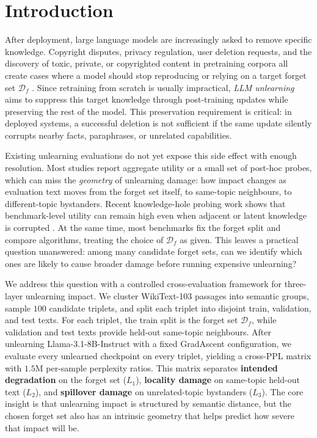 \documentclass[11pt,a4paper]{article}
\newcommand{\Df}{\mathcal{D}_f}
\newcommand{\Lone}{L_1}
\newcommand{\Ltwo}{L_2}
\newcommand{\Lthree}{L_3}
\begin{document}
\section{Introduction}
\label{sec:intro}

After deployment, large language models are increasingly asked to remove
specific knowledge. Copyright disputes, privacy regulation, user deletion
requests, and the discovery of toxic, private, or copyrighted content in
pretraining corpora all create cases where a model should stop reproducing or
relying on a target forget set $\Df$
\citep{maini2024tofu, shi2024muse, dorna2025openunlearning}. Since retraining
from scratch is usually impractical, \emph{LLM unlearning} aims to suppress
this target knowledge through post-training updates while preserving the rest
of the model. This preservation requirement is critical: in deployed systems, a
successful deletion is not sufficient if the same update silently corrupts
nearby facts, paraphrases, or unrelated capabilities.

Existing unlearning evaluations do not yet expose this side effect with enough
resolution. Most studies report aggregate utility or a small set of post-hoc
probes, which can miss the \emph{geometry} of unlearning damage: how impact
changes as evaluation text moves from the forget set itself, to same-topic
neighbours, to different-topic bystanders. Recent knowledge-hole probing work
shows that benchmark-level utility can remain high even when adjacent or latent
knowledge is corrupted \citep{ko2025probing}. At the same time, most benchmarks
fix the forget split and compare algorithms, treating the choice of $\Df$ as
given. This leaves a practical question unanswered: among many candidate forget
sets, can we identify which ones are likely to cause broader damage before
running expensive unlearning?

We address this question with a controlled cross-evaluation framework for
three-layer unlearning impact. We cluster WikiText-103 passages into semantic
groups, sample $100$ candidate triplets, and split each triplet into disjoint
train, validation, and test texts. For each triplet, the train split is the
forget set $\Df$, while validation and test texts provide held-out same-topic
neighbours. After unlearning Llama-3.1-8B-Instruct with a fixed GradAscent
configuration, we evaluate every unlearned checkpoint on every triplet,
yielding a cross-PPL matrix with $1.5$M per-sample perplexity ratios. This
matrix separates \textbf{intended degradation} on the forget set ($\Lone$),
\textbf{locality damage} on same-topic held-out text ($\Ltwo$), and
\textbf{spillover damage} on unrelated-topic bystanders ($\Lthree$). The core
insight is that unlearning impact is structured by semantic distance, but the
chosen forget set also has an intrinsic geometry that helps predict how severe
that impact will be.
\end{document}
